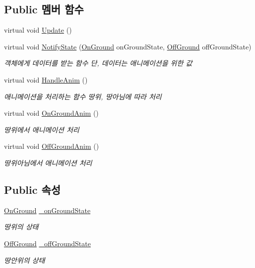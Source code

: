 \subsection*{Public 멤버 함수}
\begin{DoxyCompactItemize}
\item 
virtual void \mbox{\hyperlink{class_state_ad3ecac701a93b8ef7e5365e0fc599243}{Update}} ()
\item 
virtual void \mbox{\hyperlink{class_state_a989a27f9b711812d983344ee381da419}{Notify\+State}} (\mbox{\hyperlink{class_state_ab9eb1c1d81f1903b8486d1275e78b68e}{On\+Ground}} on\+Ground\+State, \mbox{\hyperlink{class_state_a7d945e793324c017a973205564cf1a56}{Off\+Ground}} off\+Ground\+State)
\begin{DoxyCompactList}\small\item\em 객체에게 데이터를 받는 함수 단, 데이터는 애니메이션을 위한 값 \end{DoxyCompactList}\item 
virtual void \mbox{\hyperlink{class_state_aa064ec6cd84d4a09b2c72a536125c74b}{Handle\+Anim}} ()
\begin{DoxyCompactList}\small\item\em 애니메이션을 처리하는 함수\textquotesingle{} 땅위, 땅아님에 따라 처리 \end{DoxyCompactList}\item 
virtual void \mbox{\hyperlink{class_state_adc5e7be4e977f0a64b29b01171eda8af}{On\+Ground\+Anim}} ()
\begin{DoxyCompactList}\small\item\em 땅위에서 애니메이션 처리 \end{DoxyCompactList}\item 
virtual void \mbox{\hyperlink{class_state_a2909a234430fa7752fadf2bb993ab5e2}{Off\+Ground\+Anim}} ()
\begin{DoxyCompactList}\small\item\em 땅위아님에서 애니메이션 처리 \end{DoxyCompactList}\end{DoxyCompactItemize}
\subsection*{Public 속성}
\begin{DoxyCompactItemize}
\item 
\mbox{\hyperlink{class_state_ab9eb1c1d81f1903b8486d1275e78b68e}{On\+Ground}} \mbox{\hyperlink{class_state_ab3170df5e58f541f39edff3c1278d443}{\+\_\+on\+Ground\+State}}
\begin{DoxyCompactList}\small\item\em 땅위의 상태 \end{DoxyCompactList}\item 
\mbox{\hyperlink{class_state_a7d945e793324c017a973205564cf1a56}{Off\+Ground}} \mbox{\hyperlink{class_state_ad421039bfc35b46969f174c9617ab786}{\+\_\+off\+Ground\+State}}
\begin{DoxyCompactList}\small\item\em 땅안위의 상태 \end{DoxyCompactList}\end{DoxyCompactItemize}

